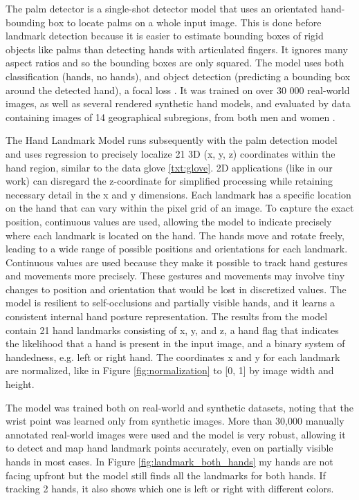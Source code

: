 The palm detector is a single-shot detector model that uses an orientated hand-bounding box to locate palms on a whole input image. This is done before landmark detection because it is easier to estimate bounding boxes of rigid objects like palms than detecting hands with articulated fingers. It ignores many aspect ratios and so the bounding boxes are only squared. The model uses both classification (hands, no hands), and object detection (predicting a bounding box around the detected hand), a focal loss \cite{DBLP:journals/corr/abs-1708-02002}. It was trained on over 30 000 real-world images, as well as several rendered synthetic hand models, and evaluated by data containing images of 14 geographical subregions, from both men and women \cite{GoogleHandLandmarker}.


The Hand Landmark Model runs subsequently with the palm detection model and uses regression to precisely localize 21 3D (x, y, z) coordinates within the hand region, similar to the data glove \ref{txt:glove}. 2D applications (like in our work) can disregard the z-coordinate for simplified processing while retaining necessary detail in the x and y dimensions. Each landmark has a specific location on the hand that can vary within the pixel grid of an image. To capture the exact position, continuous values are used, allowing the model to indicate precisely where each landmark is located on the hand. The hands move and rotate freely, leading to a wide range of possible positions and orientations for each landmark. Continuous values are used because they make it possible to track hand gestures and movements more precisely. These gestures and movements may involve tiny changes to position and orientation that would be lost in discretized values.
The model is resilient to self-occlusions and partially visible hands, and it learns a consistent internal hand posture representation. The results from the model contain 21 hand landmarks consisting of x, y, and z, a hand flag that indicates the likelihood that a hand is present in the input image, and a binary system of handedness, e.g. left or right hand.
The coordinates x and y for each landmark are normalized, like in Figure \ref{fig:normalization} to [0, 1] by image width and height. 

The model was trained both on real-world and synthetic datasets, noting that the wrist point was learned only from synthetic images. More than 30,000 manually annotated real-world images were used and the model is very robust, allowing it to detect and map hand landmark points accurately, even on partially visible hands in most cases. In Figure
\ref{fig:landmark_both_hands} my hands are not facing upfront but the model still finds all the landmarks for both hands. If tracking 2 hands, it also shows which one is left or right with different colors.

